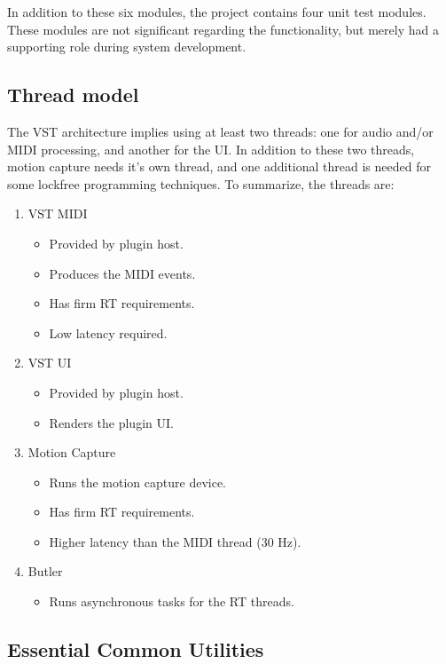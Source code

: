 In addition to these six modules,
the project contains four unit test modules.
These modules are not significant regarding the functionality,
but merely had a supporting role during system development.

\subsection{Thread model}

The VST architecture implies using at least two threads:
one for audio and/or MIDI processing,
and another for the UI.
In addition to these two threads,
motion capture needs it's own thread,
and one additional thread is needed for some
lockfree programming techniques.
To summarize, the threads are:
\begin{enumerate}

\item VST MIDI
\begin{itemize}
\item Provided by plugin host.
\item Produces the MIDI events.
\item Has firm RT requirements.
\item Low latency required.
\end{itemize}

\item VST UI
\begin{itemize}
\item Provided by plugin host.
\item Renders the plugin UI.
\end{itemize}

\item Motion Capture
\begin{itemize}
\item Runs the motion capture device.
\item Has firm RT requirements.
\item Higher latency than the MIDI thread (30 Hz).
\end{itemize}

\item Butler
\begin{itemize}
\item Runs asynchronous tasks for the RT threads.
\end{itemize}

\end{enumerate}

\subsection{Essential Common Utilities}

